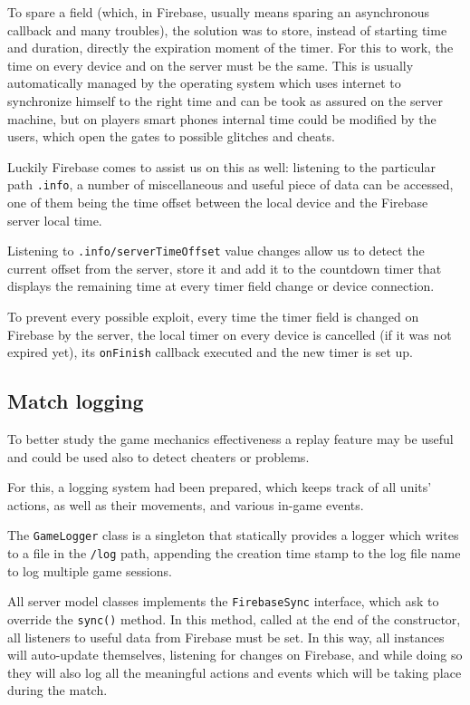 			To spare a field (which, in Firebase, usually means sparing an asynchronous callback and many troubles), the solution was to store, instead of starting time and duration, directly the expiration moment of the timer.
			For this to work, the time on every device and on the server must be the same. This is usually automatically managed by the operating system which uses internet to synchronize himself to the right time and can be took as assured on the server machine, but on players smart phones internal time could be modified by the users, which open the gates to possible glitches and cheats.
			
			Luckily Firebase comes to assist us on this as well: listening to the particular path \lstinline|.info|, a number of miscellaneous and useful piece of data can be accessed, one of them being the time offset between the local device and the Firebase server local time.
			
			Listening to \lstinline|.info/serverTimeOffset| value changes allow us to detect the current offset from the server, store it and add it to the countdown timer that displays the remaining time at every timer field change or device connection.
			
			To prevent every possible exploit, every time the timer field is changed on Firebase by the server, the local timer on every device is cancelled (if it was not expired yet), its \lstinline|onFinish| callback executed and the new timer is set up.
		
		\subsection{Match logging}\label{focus:log}
		
			To better study the game mechanics effectiveness a replay feature may be useful and could be used also to detect cheaters or problems.
			
			For this, a logging system had been prepared, which keeps track of all units' actions, as well as their movements, and various in-game events.
			
			The \lstinline|GameLogger| class is a singleton that statically provides a logger which writes to a file in the \lstinline|/log| path, appending the creation time stamp to the log file name to log multiple game sessions.
			
			All server model classes implements the \lstinline|FirebaseSync| interface, which ask to override the \lstinline|sync()| method.
			In this method, called at the end of the constructor, all listeners to useful data from Firebase must be set.
			In this way, all instances will auto-update themselves, listening for changes on Firebase, and while doing so they will also log all the meaningful actions and events which will be taking place during the match.
			
